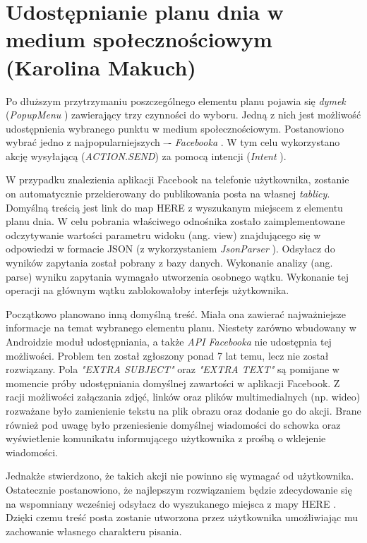 \section{Udostępnianie planu dnia w medium społecznościowym (Karolina Makuch)}
\par  Po dłuższym przytrzymaniu poszczególnego elementu planu pojawia się \textit{dymek}  (\textit{PopupMenu} \cite{PopupMenu}) zawierający trzy czynności do wyboru. Jedną z nich jest możliwość udostępnienia wybranego punktu w medium społecznościowym. Postanowiono wybrać jedno z najpopularniejszych –- \textit{Facebooka} \cite{Facebook}. W tym celu wykorzystano akcję wysyłającą (\textit{ACTION.SEND}) za pomocą intencji (\textit{Intent} \cite{Intent}).
\par  W przypadku znalezienia aplikacji Facebook na telefonie użytkownika, zostanie on automatycznie przekierowany do publikowania posta na własnej \textit{tablicy}. Domyślną treścią jest link do map HERE \cite{mobileHere} z wyszukanym miejscem z elementu planu dnia. W celu pobrania właściwego odnośnika  zostało zaimplementowane odczytywanie wartości parametru widoku (ang. view) znajdującego się w odpowiedzi w formacie JSON (z wykorzystaniem \textit{JsonParser} \cite{JsonParser}). Odsyłacz do wyników zapytania został pobrany z bazy danych. Wykonanie analizy (ang. parse) wyniku zapytania wymagało utworzenia osobnego wątku.
Wykonanie tej operacji na głównym wątku zablokowałoby interfejs użytkownika. 
\par Początkowo planowano inną domyślną treść. Miała ona zawierać najważniejsze informacje na temat wybranego elementu planu. Niestety zarówno wbudowany w Androidzie moduł  udostępniania, a także \textit{API Facebooka} nie udostępnia tej możliwości. Problem ten został zgłoszony ponad 7 lat temu, lecz nie został rozwiązany\cite{FacebookBug}. Pola \textit{"EXTRA SUBJECT"} oraz \textit{"EXTRA TEXT"} są pomijane w momencie próby udostępniania domyślnej zawartości w aplikacji Facebook. Z racji możliwości załączania zdjęć, linków oraz plików multimedialnych (np. wideo) rozważane było zamienienie tekstu na plik obrazu oraz dodanie go do akcji. Brane również pod uwagę było przeniesienie domyślnej wiadomości do schowka oraz wyświetlenie komunikatu informującego użytkownika z prośbą o wklejenie wiadomości.
\par Jednakże stwierdzono, że takich akcji nie powinno się wymagać od użytkownika. Ostatecznie postanowiono, że najlepszym rozwiązaniem będzie zdecydowanie się na wspomniany wcześniej odsyłacz do wyszukanego miejsca z mapy HERE \cite{mobileHere}. Dzięki czemu treść posta zostanie utworzona przez użytkownika umożliwiając mu zachowanie własnego charakteru pisania.

